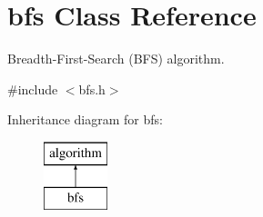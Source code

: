 \hypertarget{classbfs}{}\section{bfs Class Reference}
\label{classbfs}


Breadth-\/\+First-\/\+Search (B\+FS) algorithm.  




{\ttfamily \#include $<$bfs.\+h$>$}

Inheritance diagram for bfs\+:\begin{figure}[H]
\begin{center}
\leavevmode
\includegraphics[height=2.000000cm]{classbfs}
\end{center}
\end{figure}
